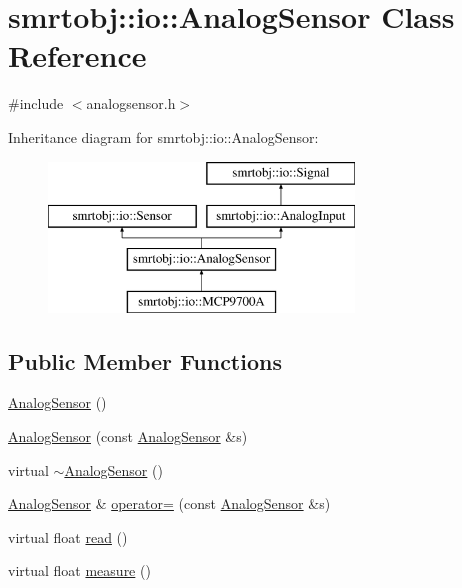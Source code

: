 \hypertarget{classsmrtobj_1_1io_1_1_analog_sensor}{}\section{smrtobj\+:\+:io\+:\+:Analog\+Sensor Class Reference}
\label{classsmrtobj_1_1io_1_1_analog_sensor}


{\ttfamily \#include $<$analogsensor.\+h$>$}

Inheritance diagram for smrtobj\+:\+:io\+:\+:Analog\+Sensor\+:\begin{figure}[H]
\begin{center}
\leavevmode
\includegraphics[height=4.000000cm]{classsmrtobj_1_1io_1_1_analog_sensor}
\end{center}
\end{figure}
\subsection*{Public Member Functions}
\begin{DoxyCompactItemize}
\item 
\hyperlink{classsmrtobj_1_1io_1_1_analog_sensor_a2d2cf5325090f91a9620bc2504b7833d}{Analog\+Sensor} ()
\item 
\hyperlink{classsmrtobj_1_1io_1_1_analog_sensor_a3f15baecbab62f6a285eec610de6eddc}{Analog\+Sensor} (const \hyperlink{classsmrtobj_1_1io_1_1_analog_sensor}{Analog\+Sensor} \&s)
\item 
virtual \hyperlink{classsmrtobj_1_1io_1_1_analog_sensor_a219be0f06be040ce9aa9238412885253}{$\sim$\+Analog\+Sensor} ()
\item 
\hyperlink{classsmrtobj_1_1io_1_1_analog_sensor}{Analog\+Sensor} \& \hyperlink{classsmrtobj_1_1io_1_1_analog_sensor_a54f94abe224bec306872b1fb5ca9180e}{operator=} (const \hyperlink{classsmrtobj_1_1io_1_1_analog_sensor}{Analog\+Sensor} \&s)
\item 
virtual float \hyperlink{classsmrtobj_1_1io_1_1_analog_sensor_a1084904f7f66c5f1e65b75ebdf3bf6b6}{read} ()
\item 
virtual float \hyperlink{classsmrtobj_1_1io_1_1_analog_sensor_a67dd93a15352fa4a98d036194963c4a7}{measure} ()
\end{DoxyCompactItemize}

